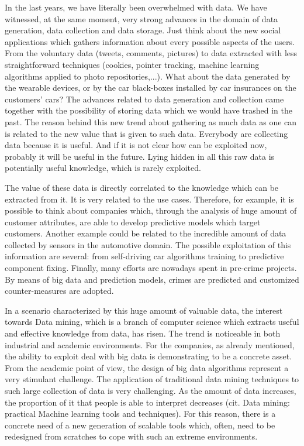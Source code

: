 In the last years, we have literally been overwhelmed with data. 
We have witnessed, at the same moment, very strong advances in the domain of data generation, data collection and data storage.
Just think about the new social applications which gathers information about every possible aspects of the users. From the voluntary data (tweets, comments, pictures) to data extracted with less straightforward techniques (cookies, pointer tracking, machine learning algorithms applied to photo repositories,...). What about the data generated by the wearable devices, or by the car black-boxes installed by car insurances on the customers' cars?
The advances related to data generation and collection came together with the possibility of storing data which we would have trashed in the past. The reason behind this new trend about gathering as much data as one can is related to the new value that is given to such data.
Everybody are collecting data because it is useful. And if it is not clear how can be exploited now, probably it will be useful in the future.
Lying hidden in all this raw data is potentially useful knowledge, which is rarely exploited. 

The value of these data is directly correlated to the knowledge which can be extracted from it. It is very related to the use cases. Therefore, for example, it is possible to think about companies which, through the analysis of huge amount of customer attributes, are able to develop predictive models which target customers. Another example could be related to the incredible amount of data collected by sensors in the automotive domain. The possible exploitation of this information are several: from self-driving car algorithms training to predictive component fixing. Finally, many efforts are nowadays spent in pre-crime projects. By means of big data and prediction models, crimes are predicted and customized counter-measures are adopted.

In a scenario characterized by this huge amount of valuable data,  the interest towards Data mining, which is a branch of computer science which extracts useful and effective knowledge from data, has risen. The trend is noticeable in both industrial and academic environments. For the companies, as already mentioned, the ability to exploit deal with big data is demonstrating to be a concrete asset. From the academic point of view, the design of big data algorithms represent a very stimulant challenge. The application of traditional data mining techniques to such large collection of data is very challenging. As the amount of data increases, the proportion of it that people is able to interpret decreases (cit. Data mining: practical Machine learning tools and techniques). For this reason, there is a concrete need of a new generation of scalable tools which, often, need to be redesigned from scratches to cope with such an extreme environments.

